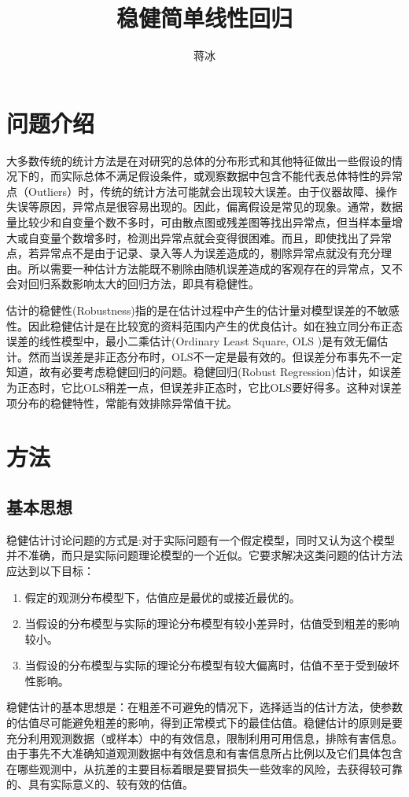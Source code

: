 \documentclass[english]{article}\usepackage[]{graphicx}\usepackage[]{color}
\begin{document}
\title{稳健简单线性回归}


\author{蒋冰}

\maketitle

\section{问题介绍}

大多数传统的统计方法是在对研究的总体的分布形式和其他特征做出一些假设的情况下的，而实际总体不满足假设条件，或观察数据中包含不能代表总体特性的异常点（Outliers）时，传统的统计方法可能就会出现较大误差。由于仪器故障、操作失误等原因，异常点是很容易出现的。因此，偏离假设是常见的现象。通常，数据量比较少和自变量个数不多时，可由散点图或残差图等找出异常点，但当样本量增大或自变量个数增多时，检测出异常点就会变得很困难。而且，即使找出了异常点，若异常点不是由于记录、录入等人为误差造成的，剔除异常点就没有充分理由。所以需要一种估计方法能既不剔除由随机误差造成的客观存在的异常点，又不会对回归系数影响太大的回归方法，即具有稳健性。

估计的稳健性(Robustness)指的是在估计过程中产生的估计量对模型误差的不敏感性。因此稳健估计是在比较宽的资料范围内产生的优良估计。如在独立同分布正态误差的线性模型中，最小二乘估计(Ordinary
Least Square, OLS )是有效无偏估计。然而当误差是非正态分布时，OLS不一定是最有效的。但误差分布事先不一定知道，故有必要考虑稳健回归的问题。稳健回归(Robust
Regression)估计，如误差为正态时，它比OLS稍差一点，但误差非正态时，它比OLS要好得多。这种对误差项分布的稳健特性，常能有效排除异常值干扰。


\section{方法}


\subsection{基本思想}

稳健估计讨论问题的方式是:对于实际问题有一个假定模型，同时又认为这个模型并不准确，而只是实际问题理论模型的一个近似。它要求解决这类问题的估计方法应达到以下目标：
\begin{enumerate}
\item 假定的观测分布模型下，估值应是最优的或接近最优的。
\item 当假设的分布模型与实际的理论分布模型有较小差异时，估值受到粗差的影响较小。
\item 当假设的分布模型与实际的理论分布模型有较大偏离时，估值不至于受到破坏性影响。
\end{enumerate}
稳健估计的基本思想是：在粗差不可避免的情况下，选择适当的估计方法，使参数的估值尽可能避免粗差的影响，得到正常模式下的最佳估值。稳健估计的原则是要充分利用观测数据（或样本）中的有效信息，限制利用可用信息，排除有害信息。由于事先不大准确知道观测数据中有效信息和有害信息所占比例以及它们具体包含在哪些观测中，从抗差的主要目标着眼是要冒损失一些效率的风险，去获得较可靠的、具有实际意义的、较有效的估值。 
\end{document}
